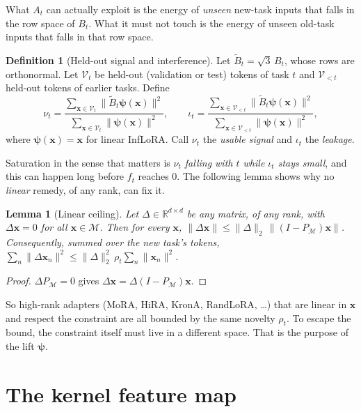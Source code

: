 \documentclass[11pt]{article}
\theoremstyle{plain}
\newtheorem{lemma}[proposition]{Lemma}
\theoremstyle{definition}
\newtheorem{definition}{Definition}
\theoremstyle{remark}
\newcommand{\R}{\mathbb{R}}
\newcommand{\M}{\mathcal{M}}
\newcommand{\x}{\bm{x}}
\newcommand{\vpsi}{\bm{\psi}}
\begin{document}
What $A_t$ can actually exploit is the energy of \emph{unseen} new-task inputs that falls in the row space of $B_t$. What it must not touch is the energy of unseen old-task inputs that falls in that row space.

\begin{definition}[Held-out signal and interference]\label{def:nu}
Let $\widetilde B_t=\sqrt3\,B_t$, whose rows are orthonormal. Let $\mathcal V_t$ be held-out (validation or test) tokens of task $t$ and $\mathcal V_{<t}$ held-out tokens of earlier tasks. Define
\begin{equation}\label{eq:nu}
\nu_t=\frac{\sum_{\x\in\mathcal V_t}\|\widetilde B_t\vpsi(\x)\|^2}{\sum_{\x\in\mathcal V_t}\|\vpsi(\x)\|^2},
\qquad
\iota_t=\frac{\sum_{\x\in\mathcal V_{<t}}\|\widetilde B_t\vpsi(\x)\|^2}{\sum_{\x\in\mathcal V_{<t}}\|\vpsi(\x)\|^2},
\end{equation}
where $\vpsi(\x)=\x$ for linear InfLoRA. Call $\nu_t$ the \emph{usable signal} and $\iota_t$ the \emph{leakage}.
\end{definition}

Saturation in the sense that matters is \emph{$\nu_t$ falling with $t$ while $\iota_t$ stays small}, and this can happen long before $f_t$ reaches $0$. The following lemma shows why no \emph{linear} remedy, of any rank, can fix it.

\begin{lemma}[Linear ceiling]\label{lem:ceiling}
Let $\Delta\in\R^{d\times d}$ be any matrix, of any rank, with $\Delta\x=0$ for all $\x\in\M$. Then for every $\x$,
$\|\Delta\x\|\le\|\Delta\|_2\,\|(I-P_\M)\x\|$. Consequently, summed over the new task's tokens,
$\sum_n\|\Delta\x_n\|^2\le\|\Delta\|_2^2\,\rho_t\sum_n\|\x_n\|^2$.
\end{lemma}
\begin{proof}
$\Delta P_\M=0$ gives $\Delta\x=\Delta(I-P_\M)\x$.
\end{proof}

So high-rank adapters (MoRA, HiRA, KronA, RandLoRA, \dots) that are linear in $\x$ and respect the constraint are all bounded by the same novelty $\rho_t$. To escape the bound, the constraint itself must live in a different space. That is the purpose of the lift $\vpsi$.

\section{The kernel feature map}\label{sec:features}
\end{document}
